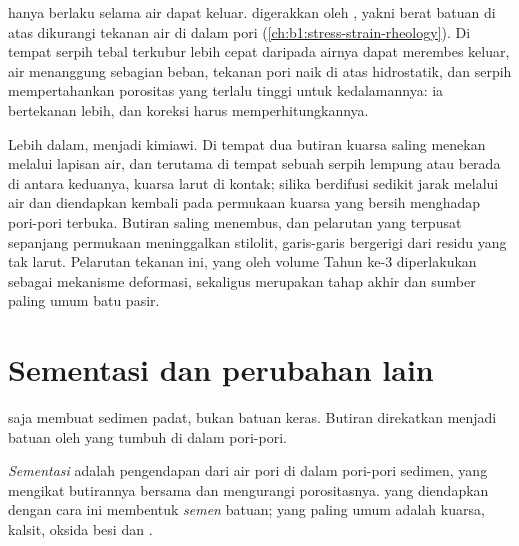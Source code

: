  hanya berlaku selama air dapat keluar.  digerakkan oleh , yakni berat batuan di atas dikurangi tekanan air di dalam pori (\cref{ch:b1:stress-strain-rheology}). Di tempat serpih tebal terkubur lebih cepat daripada airnya dapat merembes keluar, air menanggung sebagian beban, tekanan pori naik di atas hidrostatik, dan serpih mempertahankan porositas yang terlalu tinggi untuk kedalamannya: ia bertekanan lebih, dan koreksi  harus memperhitungkannya.

Lebih dalam,  menjadi kimiawi. Di tempat dua butiran kuarsa saling menekan melalui lapisan air, dan terutama di tempat sebuah serpih lempung atau  berada di antara keduanya, kuarsa larut di kontak; silika berdifusi sedikit jarak melalui air dan diendapkan kembali pada permukaan kuarsa yang bersih menghadap pori-pori terbuka. Butiran saling menembus, dan pelarutan yang terpusat sepanjang permukaan meninggalkan stilolit, garis-garis bergerigi dari residu yang tak larut. Pelarutan tekanan ini, yang oleh volume Tahun ke-3 diperlakukan sebagai mekanisme deformasi, sekaligus merupakan tahap akhir  dan sumber  paling umum batu pasir.

\section{Sementasi dan perubahan lain}\label{sec:b1:diagenesis-basins:cementation}

 saja membuat sedimen padat, bukan batuan keras. Butiran direkatkan menjadi batuan oleh  yang tumbuh di dalam pori-pori.

\begin{definition}\label{def:b1:diagenesis-basins:cement}
\emph{Sementasi} adalah pengendapan  dari air pori di dalam pori-pori sedimen, yang mengikat butirannya bersama dan mengurangi porositasnya.  yang diendapkan dengan cara ini membentuk \emph{semen} batuan; yang paling umum adalah kuarsa, kalsit, oksida besi dan .
\end{definition}

